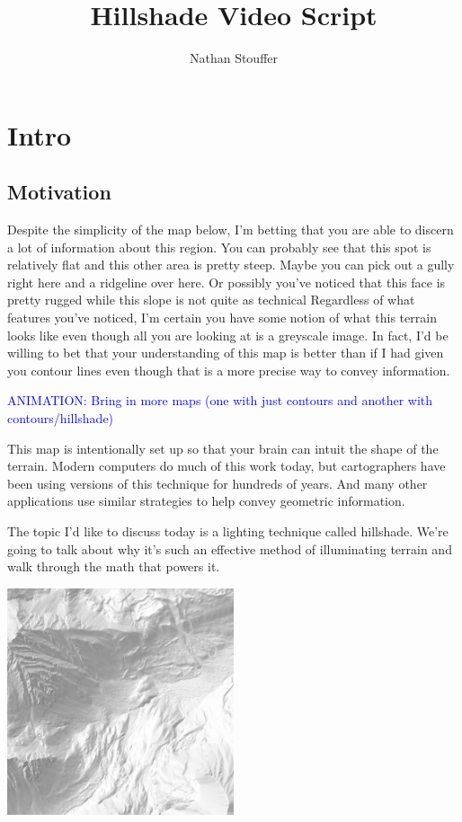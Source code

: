 \documentclass{article}
\newcommand\animation[1]{\textcolor{blue}{ANIMATION: #1}}
\begin{document}
	
\title{Hillshade Video Script}
\author{Nathan Stouffer}
\date{}
\maketitle

\section{Intro}

\subsection{Motivation}

Despite the simplicity of the map below, I'm betting that you are able to discern a lot of information about this region.
You can probably see that this spot is relatively flat and this other area is pretty steep.
Maybe you can pick out a gully right here and a ridgeline over here.
Or possibly you've noticed that this face is pretty rugged while this slope is not quite as technical
Regardless of what features you've noticed, I'm certain you have some notion of what this terrain looks like even though all you are looking at is a greyscale image.
In fact, I'd be willing to bet that your understanding of this map is better than if I had given you contour lines even though that is a more precise way to convey information.

\animation{Bring in more maps (one with just contours and another with contours/hillshade)}

This map is intentionally set up so that your brain can intuit the shape of the terrain.
Modern computers do much of this work today, but cartographers have been using versions of this technique for hundreds of years.
And many other applications use similar strategies to help convey geometric information.

The topic I'd like to discuss today is a lighting technique called hillshade.
We're going to talk about why it's such an effective method of illuminating terrain and walk through the math that powers it.

\begin{center}
	\includegraphics[width=0.5\textwidth,frame]{assets/hillshade-example.png}
\end{center}
\end{document}
